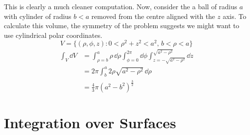 \documentclass{article}
\begin{document}
This is clearly a much cleaner computation. Now, consider the a ball of radius $a$ with cylinder of radius $b<a$ removed from the centre aligned with the $z$ axis. To calculate this volume, the symmetry of the problem suggests we might want to use cylindrical polar coordinates.
\[ V = \{ (\rho, \phi, z) \colon 0 < \rho^2 + z^2 < a^2,\, b < \rho < a \} \]
\begin{align*}
    \int_V \dd{V} & = \int_{\rho=b}^a \rho\,\dd \rho \int_{\phi=0}^{2\pi} \dd \phi \int_{z=-\sqrt{a^2 - \rho^2}}^{\sqrt{a^2 - \rho^2}} \dd{z} \\
                  & = 2 \pi \int_b^a 2\rho\sqrt{a^2 - \rho^2}\,\dd \rho                                                                       \\
                  & = \frac{4}{3}\pi (a^2 - b^2)^{\frac{3}{2}}
\end{align*}

\section{Integration over Surfaces}
\end{document}
